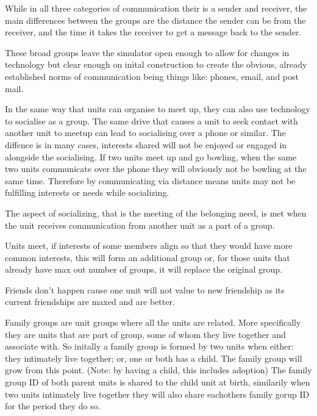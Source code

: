 While in all three categories of communication their is a sender and receiver, the main differences between the groups are the distance the sender can be from the receiver, and the time it takes the receiver to get a message back to the sender. 

These broad groups leave the simulator open enough to allow for changes in technology but clear enough on inital construction to create the obvious, already established norms of communication being things like: phones, email, and post mail.



In the same way that units can organise to meet up, they can also use technology to socialise as a group. The same drive that causes a unit to seek contact with another unit to meetup can lead to socialising over a phone or similar. The diffence is in many cases, interests shared will not be enjoyed or engaged in alongside the socialising. If two units meet up and go bowling, when the same two units communicate over the phone they will obviously not be bowling at the same time. Therefore by communicating via distance means units may not be fulfilling interests or needs while socializing.  

The aspect of socializing, that is the meeting of the belonging need, is met when the unit receives communication from another unit as a part of a group. 


Units meet, if interests of some members align so that they would have more common interests, this will form an additional group or, for those units that already have max out number of groups, it will replace the original group.


Friends don't happen cause one unit will not value to new friendship as its current friendships are maxed and are better.



Family groups are unit groups where all the units are related. More specifically they are units that are part of group, some of whom they live together and associate with. So initally a family group is formed by two units when either: they intimately live together; or, one or both has a child. The family group will grow from this point. (Note: by having a child, this includes adoption) The family group ID of both parent units is shared to the child unit at birth, similarily when two units intimately live together they will also share eachothers family gorup ID for the period they do so.

